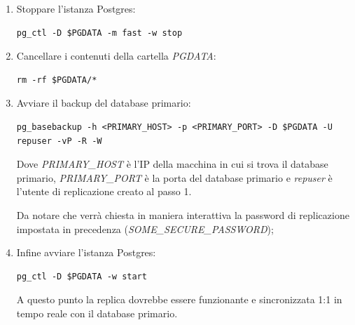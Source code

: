 \begin{enumerate}
  \item Stoppare l'istanza Postgres:
  \vspace{1mm}
\begin{lstlisting}[]
pg_ctl -D $PGDATA -m fast -w stop
\end{lstlisting}
  \item Cancellare i contenuti della cartella \textit{PGDATA}:
  \vspace{1mm}
\begin{lstlisting}[]
rm -rf $PGDATA/*
\end{lstlisting}
  \item Avviare il backup del database primario:
  \vspace{1mm}
\begin{lstlisting}[]
pg_basebackup -h <PRIMARY_HOST> -p <PRIMARY_PORT> -D $PGDATA -U repuser -vP -R -W
\end{lstlisting}
Dove \textit{PRIMARY\_HOST} è l'IP della macchina in cui si trova il database primario, \textit{PRIMARY\_PORT} è la porta del database primario e \textit{repuser} è l'utente di replicazione creato al passo 1.

Da notare che verrà chiesta in maniera interattiva la password di replicazione impostata in precedenza (\textit{SOME\_SECURE\_PASSWORD});
  \item Infine avviare l'istanza Postgres:
  \vspace{1mm}
\begin{lstlisting}[]
pg_ctl -D $PGDATA -w start
\end{lstlisting}
A questo punto la replica dovrebbe essere funzionante e sincronizzata 1:1 in tempo reale con il database primario.
\end{enumerate}

